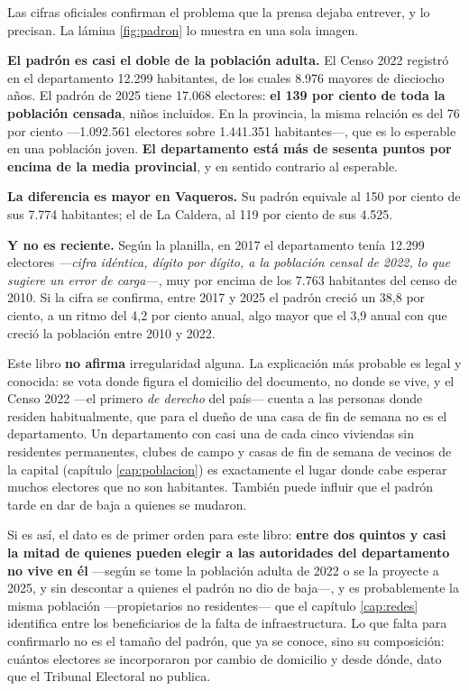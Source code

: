 \begin{cautela}
Las cifras oficiales confirman el problema que la prensa dejaba entrever, y lo precisan. La lámina \ref{fig:padron} lo muestra en una sola imagen.

\textbf{El padrón es casi el doble de la población adulta.} El Censo 2022 registró en el departamento 12.299 habitantes, de los cuales 8.976 mayores de dieciocho años. El padrón de 2025 tiene 17.068 electores: \textbf{el 139 por ciento de toda la población censada}, niños incluidos. En la provincia, la misma relación es del 76 por ciento ---1.092.561 electores sobre 1.441.351 habitantes---, que es lo esperable en una población joven. \textbf{El departamento está más de sesenta puntos por encima de la media provincial}, y en sentido contrario al esperable.

\textbf{La diferencia es mayor en Vaqueros.} Su padrón equivale al 150 por ciento de sus 7.774 habitantes; el de La Caldera, al 119 por ciento de sus 4.525.

\textbf{Y no es reciente.} Según la planilla, en 2017 el departamento tenía 12.299 electores \textit{---cifra idéntica, dígito por dígito, a la población censal de 2022, lo que sugiere un error de carga---}, muy por encima de los 7.763 habitantes del censo de 2010.  Si la cifra se confirma, entre 2017 y 2025 el padrón creció un 38,8 por ciento, a un ritmo del 4,2 por ciento anual, algo mayor que el 3,9 anual con que creció la población entre 2010 y 2022.

Este libro \textbf{no afirma} irregularidad alguna. La explicación más probable es legal y conocida: se vota donde figura el domicilio del documento, no donde se vive, y el Censo 2022 ---el primero \textit{de derecho} del país--- cuenta a las personas donde residen habitualmente, que para el dueño de una casa de fin de semana no es el departamento. Un departamento con casi una de cada cinco viviendas sin residentes permanentes, clubes de campo y casas de fin de semana de vecinos de la capital (capítulo \ref{cap:poblacion}) es exactamente el lugar donde cabe esperar muchos electores que no son habitantes. También puede influir que el padrón tarde en dar de baja a quienes se mudaron.

Si es así, el dato es de primer orden para este libro: \textbf{entre dos quintos y casi la mitad de quienes pueden elegir a las autoridades del departamento no vive en él} ---según se tome la población adulta de 2022 o se la proyecte a 2025, y sin descontar a quienes el padrón no dio de baja---, y es probablemente la misma población ---propietarios no residentes--- que el capítulo \ref{cap:redes} identifica entre los beneficiarios de la falta de infraestructura. Lo que falta para confirmarlo no es el tamaño del padrón, que ya se conoce, sino su composición: cuántos electores se incorporaron por cambio de domicilio y desde dónde, dato que el Tribunal Electoral no publica.
\end{cautela}




